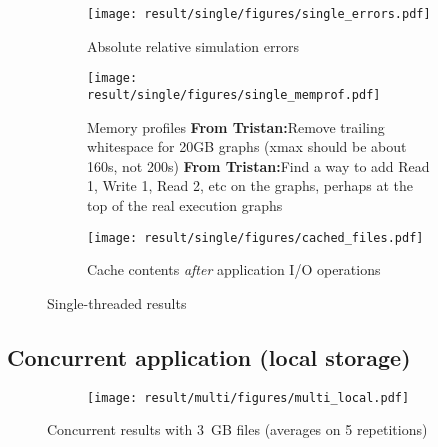 \documentclass[conference]{IEEEtran}
\newcommand{\tristan}[1]{\color{orange}\textbf{From Tristan:}#1\color{black}}
\begin{document}
            \begin{figure*}
            \centering
            \begin{subfigure}{\linewidth}
                \centering
                   \texttt{[image: result/single/figures/single\_errors.pdf]}
                   \vspace*{-0.7cm}
                   \caption{Absolute relative simulation errors}
                   \vspace*{0.5cm}
                   \label{fig:single_error}
                \end{subfigure}
            \begin{subfigure}{\linewidth}
                \centering
                   \texttt{[image: result/single/figures/single\_memprof.pdf]}
                   \vspace*{-0.7cm}
                   \caption{Memory profiles \tristan{Remove trailing
                   whitespace for 20GB graphs (xmax should be about 160s,
                   not 200s)} \tristan{Find a way to add Read 1, Write 1,
                   Read 2, etc on the graphs, perhaps at the top of the
                   real execution graphs}}
                   \vspace*{0.5cm}
                   \label{fig:single_memprof}
            \end{subfigure}
            \begin{subfigure}{\linewidth}
                \centering
                   \texttt{[image: result/single/figures/cached\_files.pdf]}
                   \caption{Cache contents \emph{after} application I/O operations}
                   \label{fig:single_cache}
            \end{subfigure}
            \caption{Single-threaded results}
            \end{figure*}



        \subsection{Concurrent application (local storage)}

            \begin{figure*}
            \begin{subfigure}{\linewidth}
                \centering
                \texttt{[image: result/multi/figures/multi\_local.pdf]}
            \end{subfigure}
            \caption{Concurrent results with 3~GB files (averages on 5 repetitions)}
            \label{fig:multi_local}
            \end{figure*}
\end{document}
